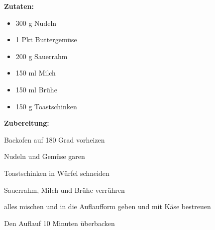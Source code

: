 

\textbf {Zutaten:} \\
\begin{itemize}
	\item 300 g Nudeln
	\item 1 Pkt Buttergemüse
	\item 200 g Sauerrahm
	\item 150 ml Milch
	\item 150 ml Brühe
	\item 150 g Toastschinken
\end{itemize}

\vspace* {2cm}

\textbf {Zubereitung:} \\
\begin{compactenum}
	\item Backofen auf 180 Grad vorheizen
	\item Nudeln und Gemüse garen
	\item Toastschinken in Würfel schneiden
	\item Sauerrahm, Milch und Brühe verrühren
	\item alles mischen und in die Auflaufform geben und mit Käse bestreuen
	\item Den Auflauf 10 Minuten überbacken
\end{compactenum}


